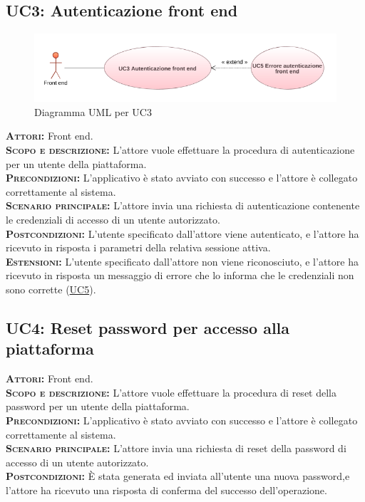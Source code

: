 \subsection{UC3: Autenticazione front end}
\label{sec:uc3}
\begin{figure}[h!]
    \centering
    \includegraphics[width=\textwidth]{figures/uc/uc3gen.png}
    \caption[Diagramma UML per UC3]{Diagramma UML per UC3
    \label{fig:uc1}}
\end{figure}   
\textsc{\textbf{Attori:}} Front end.\\
\textsc{\textbf{Scopo e descrizione:}} L'attore vuole effettuare la procedura di autenticazione per un utente della piattaforma.\\
\textsc{\textsc{\textbf{Precondizioni:}}} L'applicativo è stato avviato con successo e l'attore è collegato correttamente al sistema.\\
\textsc{\textbf{Scenario principale:}} L'attore invia una richiesta di autenticazione contenente le credenziali di accesso di un utente autorizzato.\\
\textsc{\textbf{Postcondizioni:}} L'utente specificato dall'attore viene autenticato, e l'attore ha ricevuto in risposta i parametri della relativa sessione attiva.\\
\textsc{\textbf{Estensioni:}}  L'utente specificato dall'attore non viene riconosciuto, e l'attore ha ricevuto in risposta un messaggio di errore che lo informa che le credenziali non sono corrette (\hyperref[sec:UC5]{UC5}).

\subsection{UC4: Reset password per accesso alla piattaforma}
\label{sec:uc4}
\textsc{\textbf{Attori:}} Front end.\\
\textsc{\textbf{Scopo e descrizione:}} L'attore vuole effettuare la procedura di reset della password per un utente della piattaforma.\\
\textsc{\textsc{\textbf{Precondizioni:}}} L'applicativo è stato avviato con successo e l'attore è collegato correttamente al sistema.\\
\textsc{\textbf{Scenario principale:}} L'attore invia una richiesta di reset della password di accesso di un utente autorizzato.\\
\textsc{\textbf{Postcondizioni:}} È stata generata ed inviata all'utente una nuova password,e l'attore ha ricevuto una risposta di conferma del successo dell'operazione.

